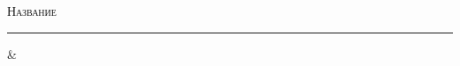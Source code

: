 
\begin{center}
    \LARGE \textsc{Название}
\end{center}

\hrule

\phantom{42}

        & \\

\thispagestyle{empty}
